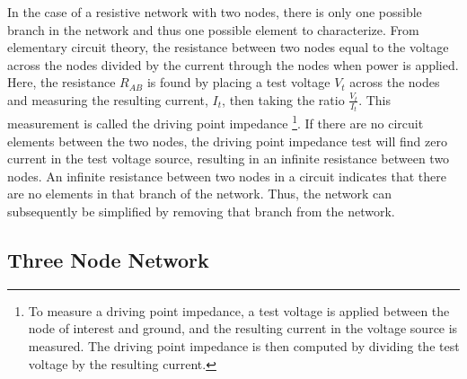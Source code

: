 In the case of a resistive network with two nodes, there is only one possible branch in the network and thus one possible element to characterize.
From elementary circuit theory, the resistance between two nodes equal to the voltage across the nodes divided by the current through the nodes when power is applied.  
Here, the resistance $R_{AB}$ is found by placing a test voltage $V_t$ across the nodes and measuring the resulting current, $I_t$, then taking the ratio $\frac{V_t}{I_t}$.
This measurement is called the driving point impedance \footnote{To measure a driving point impedance, a test voltage is applied between the node of interest and ground, and the resulting current in the voltage source is measured. 
The driving point impedance is then computed by dividing the test voltage by the resulting current.}.
If there are no circuit elements between the two nodes, the driving point impedance test will find zero current in the test voltage source, resulting in an infinite resistance between two nodes.
An infinite resistance between two nodes in a circuit indicates that there are no elements in that branch of the network.
Thus, the network can subsequently be simplified by removing that branch from the network.


\subsection{Three Node Network}

